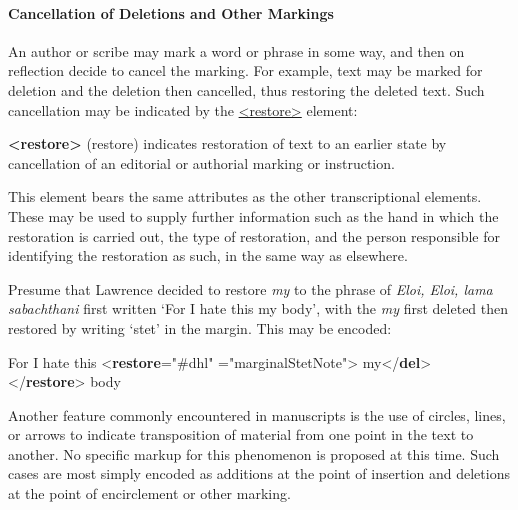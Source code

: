 \paragraph[{Cancellation of Deletions and Other Markings}]{Cancellation of Deletions and Other Markings}\label{PHCD}\par
An author or scribe may mark a word or phrase in some way, and then on reflection decide to cancel the marking. For example, text may be marked for deletion and the deletion then cancelled, thus restoring the deleted text. Such cancellation may be indicated by the \hyperref[TEI.restore]{<restore>} element: 
\begin{sansreflist}
  
\item [\textbf{<restore>}] (restore) indicates restoration of text to an earlier state by cancellation of an editorial or authorial marking or instruction.
\end{sansreflist}
\par
This element bears the same attributes as the other transcriptional elements. These may be used to supply further information such as the hand in which the restoration is carried out, the type of restoration, and the person responsible for identifying the restoration as such, in the same way as elsewhere. \par
Presume that Lawrence decided to restore \textit{my} to the phrase of \textit{Eloi, Eloi, lama sabachthani} first written ‘For I hate this my body’, with the \textit{my} first deleted then restored by writing ‘stet’ in the margin. This may be encoded: \par\bgroup{}\exampleFont \begin{shaded}\noindent\mbox{}For I hate this {<\textbf{restore}\hspace*{1em}{hand}="{\#dhl}"\mbox{}\newline 
\hspace*{1em}{type}="{marginalStetNote}">}\mbox{}\newline 
{}my{</\textbf{del}>}\mbox{}\newline 
{</\textbf{restore}>} body\end{shaded}\egroup\par \par
Another feature commonly encountered in manuscripts is the use of circles, lines, or arrows to indicate transposition of material from one point in the text to another. No specific markup for this phenomenon is proposed at this time. Such cases are most simply encoded as additions at the point of insertion and deletions at the point of encirclement or other marking. 
